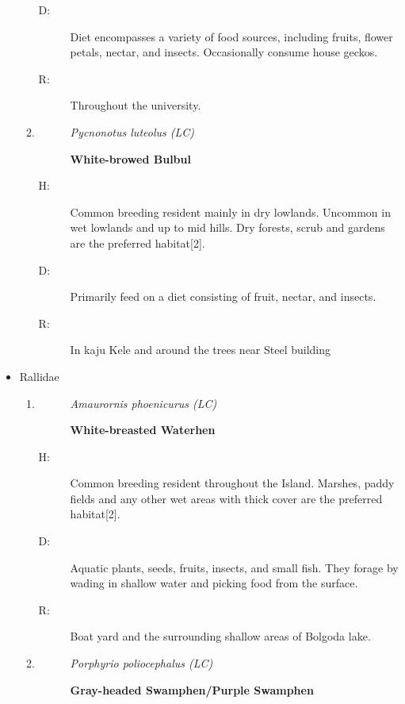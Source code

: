 \begin{itemize}
\begin{enumerate}
\begin{description}
\item[D: ]%
Diet encompasses a variety of food sources, including fruits, flower petals, nectar, and insects. Occasionally consume house geckos.%
\item[R: ]%
Throughout the university.%
\end{description}%
\item%
\begin{description}%
\item[]%
\textit{Pycnonotus luteolus (LC)}%
\item[]%
\textbf{White{-}browed Bulbul}%
\end{description}%
\begin{description}%
\item[H: ]%
Common breeding resident mainly in dry lowlands. Uncommon in wet lowlands and up to mid hills. Dry forests, scrub and gardens are the preferred habitat{[}2{]}.%
\item[D: ]%
Primarily feed on a diet consisting of fruit, nectar, and insects.%
\item[R: ]%
In kaju Kele and around the trees near Steel building%
\end{description}%
\end{enumerate}%
\item%
Rallidae%
\begin{enumerate}%
\item%
\begin{description}%
\item[]%
\textit{Amaurornis phoenicurus (LC)}%
\item[]%
\textbf{White{-}breasted Waterhen}%
\end{description}%
\begin{description}%
\item[H: ]%
Common breeding resident throughout the Island. Marshes, paddy fields and any other wet areas with thick cover are the preferred habitat{[}2{]}.%
\item[D: ]%
Aquatic plants, seeds, fruits, insects, and small fish. They forage by wading in shallow water and picking food from the surface.%
\item[R: ]%
Boat yard and the surrounding shallow areas of Bolgoda lake.%
\end{description}%
\item%
\begin{description}%
\item[]%
\textit{Porphyrio poliocephalus (LC)}%
\item[]%
\textbf{Gray{-}headed Swamphen/Purple Swamphen}%

\end{description}
\end{enumerate}
\end{itemize}

